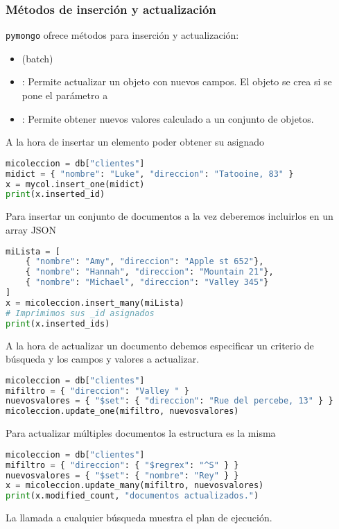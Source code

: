 \subsubsection{Métodos de inserción y actualización}
\texttt{pymongo} ofrece métodos para inserción y actualización:
\begin{itemize}
	\item {} (batch)
	\item {}: Permite actualizar un objeto con nuevos campos. El objeto se crea si se pone el parámetro  a 
	\item {}: Permite obtener nuevos valores calculado a un conjunto de objetos.
\end{itemize}
A la hora de insertar un elemento poder obtener su  asignado
\begin{lstlisting}[language=python]
micoleccion = db["clientes"]
midict = { "nombre": "Luke", "direccion": "Tatooine, 83" }
x = mycol.insert_one(midict)
print(x.inserted_id)
\end{lstlisting}
Para insertar un conjunto de documentos a la vez deberemos incluirlos en un array JSON
\begin{lstlisting}[language=python]
miLista = [
	{ "nombre": "Amy", "direccion": "Apple st 652"},
	{ "nombre": "Hannah", "direccion": "Mountain 21"},
	{ "nombre": "Michael", "direccion": "Valley 345"}
]
x = micoleccion.insert_many(miLista)
# Imprimimos sus _id asignados
print(x.inserted_ids)
\end{lstlisting}
A la hora de actualizar un documento debemos especificar un criterio de búsqueda y los campos y valores a actualizar.
\begin{lstlisting}[language=python]
micoleccion = db["clientes"]
mifiltro = { "direccion": "Valley " }
nuevosvalores = { "$set": { "direccion": "Rue del percebe, 13" } }
micoleccion.update_one(mifiltro, nuevosvalores)
\end{lstlisting}
Para actualizar múltiples documentos la estructura es la misma
\begin{lstlisting}[language=python]
micoleccion = db["clientes"]
mifiltro = { "direccion": { "$regrex": "^S" } }
nuevosvalores = { "$set": { "nombre": "Rey" } }
x = micoleccion.update_many(mifiltro, nuevosvalores)
print(x.modified_count, "documentos actualizados.")
\end{lstlisting}
La llamada  a cualquier búsqueda muestra el plan de ejecución.

